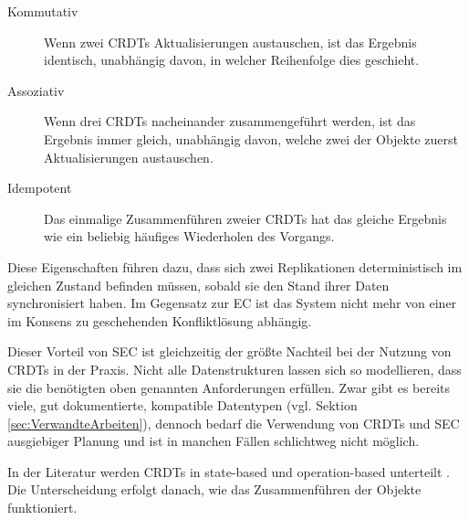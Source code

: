 \documentclass[a4paper, 12pt]{scrreprt}
\begin{document}
\begin{description}
	\label{sec:kommuassoidem}
	\item[Kommutativ] Wenn zwei \acp{CRDT} Aktualisierungen austauschen, ist das Ergebnis identisch, unabhängig davon, in welcher Reihenfolge dies geschieht.%
	\item[Assoziativ] Wenn drei \acp{CRDT} nacheinander zusammengeführt werden, ist das Ergebnis immer gleich, unabhängig davon, welche zwei der Objekte zuerst Aktualisierungen austauschen.%
	\item[Idempotent] Das einmalige Zusammenführen zweier \acp{CRDT} hat das gleiche Ergebnis wie ein beliebig häufiges Wiederholen des Vorgangs.%
\end{description}

Diese Eigenschaften führen dazu, dass sich zwei Replikationen deterministisch im gleichen Zustand befinden müssen, sobald sie den Stand ihrer Daten synchronisiert haben. Im Gegensatz zur \ac{EC} ist das System nicht mehr von einer im Konsens zu geschehenden Konfliktlösung abhängig. 

Dieser Vorteil von \ac{SEC} ist gleichzeitig der größte Nachteil bei der Nutzung von \acp{CRDT} in der Praxis. Nicht alle Datenstrukturen lassen sich so modellieren, dass sie die benötigten oben genannten Anforderungen erfüllen. Zwar gibt es bereits viele, gut dokumentierte, kompatible Datentypen (vgl. Sektion \ref{sec:VerwandteArbeiten}), dennoch bedarf die Verwendung von \acp{CRDT} und \ac{SEC} ausgiebiger Planung und ist in manchen Fällen schlichtweg nicht möglich.

In der Literatur werden \acp{CRDT} in state-based und operation-based unterteilt \autocite[S. 10]{ArticleOptimisticReplication}. Die Unterscheidung erfolgt danach, wie das Zusammenführen der Objekte funktioniert.
\end{document}
